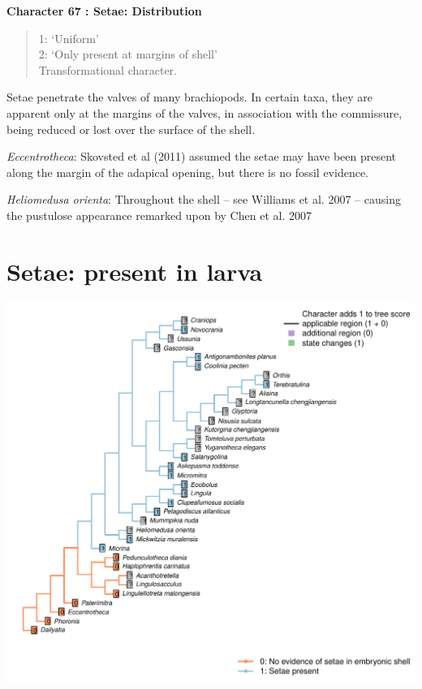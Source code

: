 \documentclass[]{book}
\theoremstyle{definition}
\theoremstyle{definition}
\theoremstyle{definition}
\theoremstyle{remark}
\begin{document}
\textbf{Character 67 : Setae: Distribution }

\begin{quote}
1: `Uniform'\\
2: `Only present at margins of shell'\\
Transformational character.
\end{quote}

Setae penetrate the valves of many brachiopods. In certain taxa, they
are apparent only at the margins of the valves, in association with the
commissure, being reduced or lost over the surface of the shell.

\emph{Eccentrotheca}: Skovsted et al (2011) assumed the setae may have
been present along the margin of the adapical opening, but there is no
fossil evidence.

\emph{Heliomedusa orienta}: Throughout the shell -- see Williams et al.
2007 -- causing the pustulose appearance remarked upon by Chen et al.
2007

\hypertarget{setae-present-in-larva}{%
\section*{Setae: present in larva}\label{setae-present-in-larva}}

\includegraphics{Brachiopod_phylogeny_files/figure-latex/unnamed-chunk-5-68.pdf}
\end{document}

